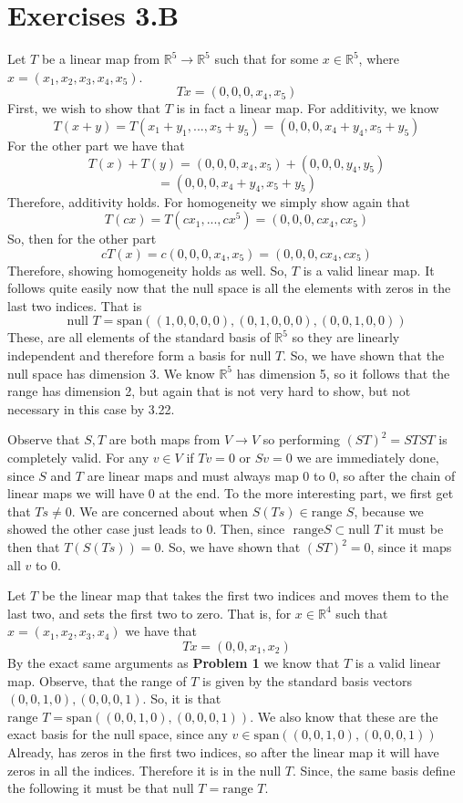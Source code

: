 \documentclass[10pt, twocolumn]{article}
\newcommand{\R}{\mathbb{R}}
\newcommand{\vspan}[1]{\text{span}\left(#1\right)}
\newcommand{\nul}{\text{null }}
\newcommand{\range}{\text{range }}
\begin{document}
\section{Exercises 3.B}
\begin{q}[1]
	Let $ T $ be a linear map from $ \R^5 \to \R^5 $ such that for some $ x \in \R^5 $, 
	where $ x = (x_1, x_2, x_3, x_4, x_5) $.
	$$ Tx = (0, 0, 0, x_4, x_5) $$
	First, we wish to show that $ T $ is in fact a linear map. 
	For additivity, we know 
	$$ T(x + y) = T(x_1 + y_1, ..., x_5 + y_5) = (0, 0, 0, x_4 + y_4, x_5 + y_5)$$
	For the other part we have that 
	$$ T(x) + T(y) = (0, 0, 0, x_4, x_5) + (0, 0, 0, y_4, y_5) $$ 
	$$ = (0, 0, 0, x_4 + y_4, x_5 + y_5) $$
	Therefore, additivity holds.
	For homogeneity we simply show again that 
	$$ T(cx) = T(cx_1, ..., cx^5) = (0, 0, 0, cx_4, cx_5) $$
	So, then for the other part
	$$ cT(x) = c (0, 0, 0, x_4, x_5) =(0, 0, 0, cx_4, cx_5) $$
	Therefore, showing homogeneity holds as well. 
	So, $ T $ is a valid linear map.
	It follows quite easily now that the null space is all the elements with zeros in the last two indices. 
	That is $$ \nul T = \vspan{(1, 0, 0, 0, 0 ), (0, 1, 0, 0, 0), (0, 0, 1, 0, 0)} $$ 
	These, are all elements of the standard basis of $ \R^5 $ so they are linearly independent and therefore form a basis for $ \nul T $.
	So, we have shown that the null space has dimension 3. We know $ \R^5 $ has dimension 5, so it follows that the range has dimension 2, 
	but again that is not very hard to show, but not necessary in this case by 3.22.
\end{q}
\begin{q}[2]
	Observe that $ S, T $ are both  maps from $ V \to V $ so performing $ (ST)^2 = STST $ is completely valid.
	For any $ v \in V $ if $ Tv = 0 $ or $ Sv = 0 $ we are immediately done, since $ S $ and $ T $ are linear maps and must always map 0 to 0, 
	so after the chain of linear maps we will have 0 at the end. 
	To the more interesting part, we first get that $ Ts \neq 0 $. 
	We are concerned about when $ S(Ts) \in \text{range } S$, because we showed the other case just leads to 0.
	Then, since $ \text{ range} S \subset \nul T $ it must be then that $ T(S(Ts)) = 0 $. 
	So, we have shown that $ (ST)^2 = 0 $, since it maps all $ v $ to 0. 
\end{q}
\begin{q}[5]
	Let $ T $ be the linear map that takes the first two indices and moves them to the last two, and sets the first two to zero. 
	That is, for $ x \in \R^4 $ such that $ x = (x_1, x_2, x_3, x_4) $ we have that 
	$$ Tx = (0, 0, x_1, x_2) $$ 
	By the exact same arguments as \textbf{Problem 1} we know that $ T $ is a valid linear map. 
	Observe, that the range of $ T $ is given by the standard basis vectors $ (0, 0, 1, 0), (0, 0, 0, 1) $. 
	So, it is that $ \range T = \vspan{(0, 0, 1, 0), (0, 0, 0, 1) } $. 
	We also know that these are the exact basis for the null space, since any $ v \in \vspan{(0, 0, 1, 0), (0, 0, 0, 1)} $ 
	Already, has zeros in the first two indices, so after the linear map it will have zeros in all the indices. Therefore it is in the $ \nul T $. 
	Since, the same basis define the following it must be that $ \nul T = \range T $. 
\end{q}
\end{document}
